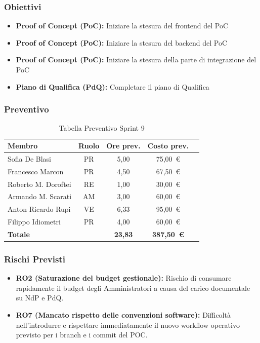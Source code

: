 \subsubsection{Obiettivi}
\begin{itemize}
    \item \textbf{Proof of Concept (PoC):} Iniziare la stesura del frontend del PoC
    \item \textbf{Proof of Concept (PoC):} Iniziare la stesura del backend del PoC
    \item \textbf{Proof of Concept (PoC):} Iniziare la stesura della parte di integrazione del PoC
    \item \textbf{Piano di Qualifica (PdQ):} Completare il piano di Qualifica
\end{itemize}

\subsubsection{Preventivo}
\begin{table}[H]
    \centering
    \renewcommand{\arraystretch}{1.3}
    \begin{tabularx}{\textwidth}{|X|c|c|c|r|}
        \hline
        \textbf{Membro} & \textbf{Ruolo} & \textbf{Ore prev.} & \textbf{Costo prev.} \\
        \hline
        Sofia De Blasi       & PR & 5,00 & 75{,}00~\euro \\
        Francesco Marcon     & PR & 4,50 & 67{,}50~\euro \\
        Roberto M. Doroftei  & RE & 1,00 & 30{,}00~\euro \\
        Armando M. Scarati   & AM & 3,00 & 60{,}00~\euro \\
        Anton Ricardo Rupi   & VE & 6,33 & 95{,}00~\euro \\
        Filippo Idiometri    & PR & 4,00 & 60{,}00~\euro \\
        \hline
        \textbf{Totale}      &    & \textbf{23,83} & \textbf{387{,}50~\euro} \\
        \hline
    \end{tabularx}
    \caption{Tabella Preventivo Sprint 9} 
\end{table}

\subsubsection{Rischi Previsti}
\begin{itemize}
    \item \textbf{RO2 (Saturazione del budget gestionale):} Rischio di consumare rapidamente il budget degli Amministratori a causa del carico documentale su NdP e PdQ.
    \item \textbf{RO7 (Mancato rispetto delle convenzioni software):} Difficoltà nell'introdurre e rispettare immediatamente il nuovo workflow operativo previsto per i branch e i commit del POC.
\end{itemize}


